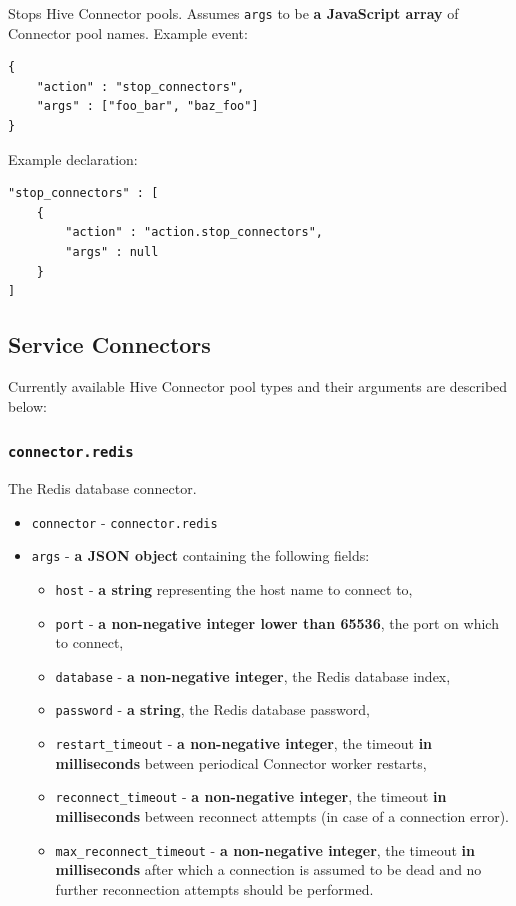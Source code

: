 \documentclass[a4paper]{article}
\begin{document}
Stops Hive Connector pools. Assumes \texttt{args} to be \textbf{a JavaScript array} of Connector pool names. Example event:


\begin{verbatim}
{
    "action" : "stop_connectors",
    "args" : ["foo_bar", "baz_foo"]
}
\end{verbatim}




\noindent
Example declaration:

\begin{verbatim}
"stop_connectors" : [
    {
        "action" : "action.stop_connectors",
        "args" : null
    }
]
\end{verbatim}
\subsection{Service Connectors}
\label{sec-8-4}
\label{ref-connectors}

Currently available Hive Connector pool types and their arguments are described below:
\subsubsection{\texttt{connector.redis}}
\label{sec-8-4-1}

The Redis database connector.


\begin{itemize}
\item \texttt{connector} - \texttt{connector.redis}
\item \texttt{args} - \textbf{a JSON object} containing the following fields:
\begin{itemize}
\item \texttt{host} - \textbf{a string} representing the host name to connect to,
\item \texttt{port} - \textbf{a non-negative integer lower than 65536}, the port on which to connect,
\item \texttt{database} - \textbf{a non-negative integer}, the Redis database index,
\item \texttt{password} - \textbf{a string}, the Redis database password,
\item \texttt{restart\_timeout} - \textbf{a non-negative integer}, the timeout \textbf{in milliseconds} between periodical Connector worker restarts,
\item \texttt{reconnect\_timeout} - \textbf{a non-negative integer}, the timeout \textbf{in milliseconds} between reconnect attempts (in case of a connection error).
\item \texttt{max\_reconnect\_timeout} - \textbf{a non-negative integer}, the timeout \textbf{in milliseconds} after which a connection is assumed to be dead and no further reconnection attempts should be performed.
\end{itemize}
\end{itemize}
\end{document}
